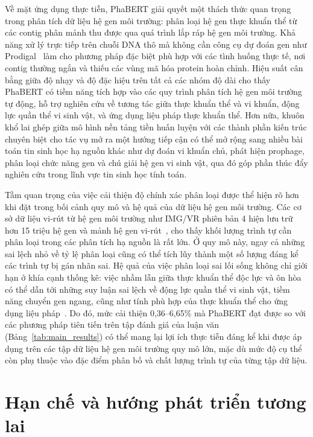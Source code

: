 Về mặt ứng dụng thực tiễn, PhaBERT giải quyết một thách thức quan trọng trong phân tích dữ liệu hệ gen môi trường: phân loại hệ gen thực khuẩn thể từ các contig phân mảnh thu được qua quá trình lắp ráp hệ gen môi trường. Khả năng xử lý trực tiếp trên chuỗi DNA thô mà không cần công cụ dự đoán gen như Prodigal~\cite{hyatt2010prodigal} làm cho phương pháp đặc biệt phù hợp với các tình huống thực tế, nơi contig thường ngắn và thiếu các vùng mã hóa protein hoàn chỉnh. Hiệu suất cân bằng giữa độ nhạy và độ đặc hiệu trên tất cả các nhóm độ dài cho thấy PhaBERT có tiềm năng tích hợp vào các quy trình phân tích hệ gen môi trường tự động, hỗ trợ nghiên cứu về tương tác giữa thực khuẩn thể và vi khuẩn, động lực quần thể vi sinh vật, và ứng dụng liệu pháp thực khuẩn thể. Hơn nữa, khuôn khổ lai ghép giữa mô hình nền tảng tiền huấn luyện với các thành phần kiến trúc chuyên biệt cho tác vụ mở ra một hướng tiếp cận có thể mở rộng sang nhiều bài toán tin sinh học hạ nguồn khác như dự đoán vi khuẩn chủ, phát hiện prophage, phân loại chức năng gen và chú giải hệ gen vi sinh vật, qua đó góp phần thúc đẩy nghiên cứu trong lĩnh vực tin sinh học tính toán.

Tầm quan trọng của việc cải thiện độ chính xác phân loại được thể hiện rõ hơn khi đặt trong bối cảnh quy mô và hệ quả của dữ liệu hệ gen môi trường. Các cơ sở dữ liệu vi-rút từ hệ gen môi trường như IMG/VR phiên bản 4 hiện lưu trữ hơn 15 triệu hệ gen và mảnh hệ gen vi-rút~\cite{camargo2023imgvr}, cho thấy khối lượng trình tự cần phân loại trong các phân tích hạ nguồn là rất lớn. Ở quy mô này, ngay cả những sai lệch nhỏ về tỷ lệ phân loại cũng có thể tích lũy thành một số lượng đáng kể các trình tự bị gán nhãn sai. Hệ quả của việc phân loại sai lối sống không chỉ giới hạn ở khía cạnh thống kê: việc nhầm lẫn giữa thực khuẩn thể độc lực và ôn hòa có thể dẫn tới những suy luận sai lệch về động lực quần thể vi sinh vật, tiềm năng chuyển gen ngang, cũng như tính phù hợp của thực khuẩn thể cho ứng dụng liệu pháp~\cite{shang2023phatyp, wu2021deephage}. Do đó, mức cải thiện 0,36--6,65\% mà PhaBERT đạt được so với các phương pháp tiên tiến trên tập đánh giá của luận văn (Bảng~\ref{tab:main_results}) có thể mang lại lợi ích thực tiễn đáng kể khi được áp dụng trên các tập dữ liệu hệ gen môi trường quy mô lớn, mặc dù mức độ cụ thể còn phụ thuộc vào đặc điểm phân bố và chất lượng trình tự của từng tập dữ liệu.

\section{Hạn chế và hướng phát triển tương lai}
\label{sec:limitations_future}

